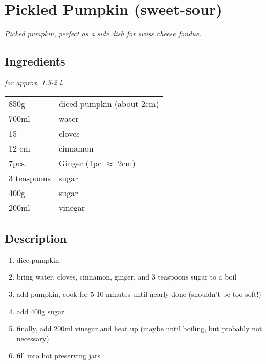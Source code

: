 \section{Pickled Pumpkin (sweet-sour)}
\textit{Picked pumpkin, perfect as a side dish for swiss cheese fondue.}

\subsection*{Ingredients}
\textit{for approx. 1.5-2 l.}

\begin{tabular}{ l l }
  850g & diced pumpkin (about 2cm)\\
  700ml & water\\
  15 & cloves\\
  12 cm & cinnamon\\
  7pcs. & Ginger (1pc $\approx$ 2cm)\\
  3 teaspoons & sugar\\
  400g & sugar\\
  200ml & vinegar\\
\end{tabular}

\subsection*{Description}
\begin{enumerate}
    \item dice pumpkin
    \item bring water, cloves, cinnamon, ginger, and 3 teaspoons sugar to a boil
    \item add pumpkin, cook for 5-10 minutes until nearly done (shouldn't be too soft!)
    \item add 400g sugar
    \item finally, add 200ml vinegar and heat up (maybe until boiling, but probably not necessary)
    \item fill into hot preserving jars
\end{enumerate}





